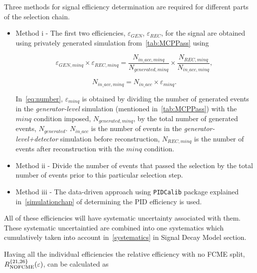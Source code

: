 Three methods for signal efficiency determination
are required for different parts of the selection chain.

\begin{itemize}
	\item Method \Rn{1} - The first two efficiencies, $\varepsilon_{GEN}$, $\varepsilon_{REC}$, for the signal are obtained using privately generated simulation from~\autoref{tab:MCPPass} using

\begin{equation}
{\varepsilon_{GEN,minq}}\times {\varepsilon_{REC,minq}}= \frac{N_{in\_acc,minq}}{N_{generated,minq}}\times \frac{N_{REC,minq}}{N_{in\_acc,minq}},
\end{equation}

\begin{equation}
N_{in\_acc,minq} = N_{in\_acc} \times \varepsilon_{minq}.
\label{eq:number}
\end{equation}

In~\autoref{eq:number}, $\varepsilon_{minq}$ is obtained by dividing the number of generated events in the \textit{generator-level} simulation (mentioned in~\autoref{tab:MCPPass}) with the $minq$ condition imposed, $N_{generated,minq}$, by the total number of generated events, $N_{generated}$. $N_{in\_acc}$ is the number of events in the \textit{generator-level+detector} simulation before reconstruction, $N_{REC,minq}$ is the number of events after reconstruction with the $minq$ condition.
\item Method \Rn{2} - Divide the number of events that passed the selection by the total number of events prior to this particular selection step.
\item Method \Rn{3} - The data-driven approach using \texttt{PIDCalib} package explained in~\autoref{simulationchap} of determining the PID efficiency is used.
\end{itemize}

All of these efficiencies will have systematic uncertainty associated with them. These systematic uncertaintied are combined into one systematics which cumulatively taken into account in~\autoref{systematics} in Signal Decay Model section. 

Having all the individual efficiencies the relative efficiency with no FCME split, $R_{\rm{NOFCME}}^{\{21,26\}}(\varepsilon)$, can be calculated as 



